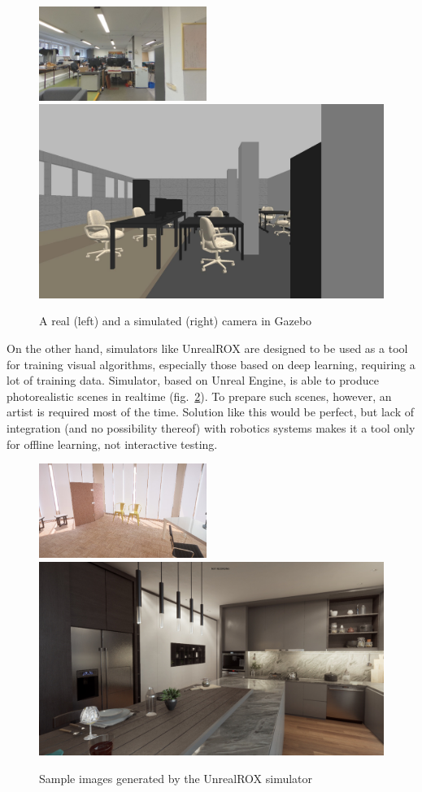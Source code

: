 \documentclass{svproc}
\begin{document}
\begin{figure}[!ht]
    \includegraphics[width=0.485\textwidth]{img/gazebo_vs_real/real.jpg}\hfill%
    \includegraphics[width=0.485\linewidth]{img/gazebo_vs_real/gazebo.jpg}
    \caption{A real (left) and a simulated (right) camera in Gazebo}
    \label{fig:gazebo_vs_real}
\end{figure}\vspace{-1mm}

On the other hand, simulators like UnrealROX are designed to be used as a tool for training visual algorithms,
especially those based on deep learning, requiring a lot of training data. Simulator, based on Unreal Engine, 
is able to produce photorealistic scenes in realtime (fig.~\ref{fig:rox_samples}). To prepare such scenes, 
however, an artist is required most of the time. Solution like this would be perfect, but lack of integration 
(and no possibility thereof) with robotics systems makes it a tool only for offline learning, not interactive
testing.

\begin{figure}[!htb]
    \includegraphics[width=0.485\textwidth]{img/gazebo_vs_real/rox1.png}\hfill%
    \includegraphics[width=0.485\linewidth]{img/gazebo_vs_real/rox2.png}
    \caption{Sample images generated by the UnrealROX simulator \cite{martinez2019unrealrox}}
    \label{fig:rox_samples}
\end{figure}
\end{document}
